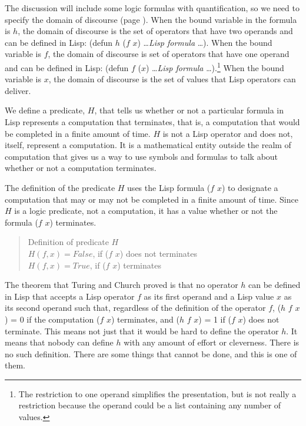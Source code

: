 The discussion will include some logic formulas with
quantification,
so we need to specify the domain of discourse
(page \pageref{def-universe-of-discourse}).
When the bound variable
in the formula is $h$, the domain of discourse
is the set of operators that have
two operands and can be defined in Lisp:
(defun $h$ ($f$ $x$) \dots \emph{Lisp formula} \dots ).
When the bound variable is $f$,
the domain of discourse is  set of operators
that have one operand and can be defined in Lisp:
(defun $f$ ($x$) \dots \emph{Lisp formula} \dots ).\footnote{The
restriction to one operand simplifies the presentation,
but is not really a restriction because the operand could
be a list containing any number of values.}
When the bound variable is $x$, the domain of discourse
is the set of values that Lisp operators can deliver.

We define a predicate, $H$, that tells us whether or not
a particular formula in Lisp represents a computation that terminates,
that is, a computation that would be completed in a finite amount of time.
$H$ is not a Lisp operator and does not, itself,
represent a computation. It is a mathematical entity
outside the realm of computation that gives us a way
to use symbols and formulas to talk about
whether or not a computation terminates.

The definition of the predicate $H$ uses the Lisp
formula ($f$ $x$) to designate a computation that may
or may not be completed in a finite amount of time.
Since $H$ is a logic predicate, not a computation,
it has a value whether or not the formula ($f$ $x$) terminates.
\begin{quote}
\label{def:predicate-H}
Definition of predicate $H$\\
$H(f, x) = False$, if ($f$ $x$) does not terminates\\
$H(f, x) = True$, if ($f$ $x$) terminates
\end{quote}

The theorem that Turing and Church proved is that
no operator $h$ can be defined in Lisp
that accepts a Lisp operator $f$ as its
first operand and a Lisp value $x$ as its second operand
such that, regardless of the definition of the operator $f$,
($h$ $f$ $x$) = 0 if the computation ($f$ $x$) terminates, and
($h$ $f$ $x$) = 1 if ($f$ $x$) does not terminate.
This means not just that it would be hard to define the operator $h$.
It means that nobody can define $h$ with any amount of effort or cleverness.
There is no such definition.
There are some things that cannot be done, and this is one of them.

